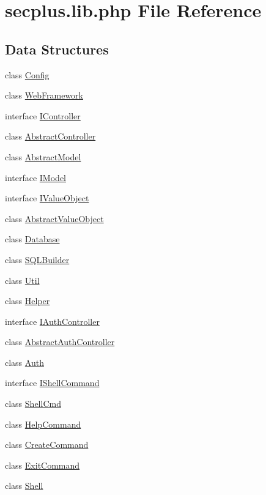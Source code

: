 \hypertarget{secplus_8lib_8php}{
\section{secplus.lib.php File Reference}
\label{secplus_8lib_8php}
}
\subsection*{Data Structures}
\begin{DoxyCompactItemize}
\item 
class \hyperlink{class_sec_plus_1_1_config}{Config}
\item 
class \hyperlink{class_sec_plus_1_1_web_framework}{WebFramework}
\item 
interface \hyperlink{interface_sec_plus_1_1_i_controller}{IController}
\item 
class \hyperlink{class_sec_plus_1_1_abstract_controller}{AbstractController}
\item 
class \hyperlink{class_sec_plus_1_1_abstract_model}{AbstractModel}
\item 
interface \hyperlink{interface_sec_plus_1_1_i_model}{IModel}
\item 
interface \hyperlink{interface_sec_plus_1_1_i_value_object}{IValueObject}
\item 
class \hyperlink{class_sec_plus_1_1_abstract_value_object}{AbstractValueObject}
\item 
class \hyperlink{class_sec_plus_1_1_database}{Database}
\item 
class \hyperlink{class_sec_plus_1_1_s_q_l_builder}{SQLBuilder}
\item 
class \hyperlink{class_sec_plus_1_1_util}{Util}
\item 
class \hyperlink{class_sec_plus_1_1_helper}{Helper}
\item 
interface \hyperlink{interface_sec_plus_1_1_i_auth_controller}{IAuthController}
\item 
class \hyperlink{class_sec_plus_1_1_abstract_auth_controller}{AbstractAuthController}
\item 
class \hyperlink{class_sec_plus_1_1_auth}{Auth}
\item 
interface \hyperlink{interface_sec_plus_1_1_i_shell_command}{IShellCommand}
\item 
class \hyperlink{class_sec_plus_1_1_shell_cmd}{ShellCmd}
\item 
class \hyperlink{class_sec_plus_1_1_help_command}{HelpCommand}
\item 
class \hyperlink{class_sec_plus_1_1_create_command}{CreateCommand}
\item 
class \hyperlink{class_sec_plus_1_1_exit_command}{ExitCommand}
\item 
class \hyperlink{class_sec_plus_1_1_shell}{Shell}
\end{DoxyCompactItemize}
